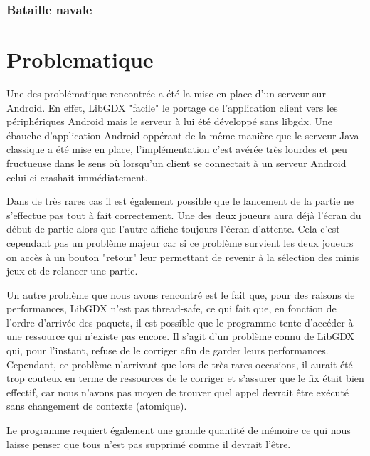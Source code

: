 \documentclass{report}
\begin{document}
\subsection{Bataille navale}





\chapter{Problematique}
Une des problématique rencontrée a été la mise en place d'un serveur sur Android. En effet, LibGDX "facile" le portage de l'application client vers les
périphériques Android mais le serveur à lui été développé sans libgdx. Une ébauche d'application Android oppérant de la même manière que le serveur Java classique a
été mise en place, l'implémentation c'est avérée très lourdes et peu fructueuse dans le sens où lorsqu'un client se connectait à un serveur Android celui-ci crashait
immédiatement.

Dans de très rares cas il est également possible que le lancement de la partie ne s'effectue pas tout à fait correctement. Une des deux joueurs aura déjà l'écran du début de partie alors
que l'autre affiche toujours l'écran d'attente. Cela c'est cependant pas un problème majeur car si ce problème survient les deux joueurs on accès à un bouton "retour" leur
permettant de revenir à la sélection des minis jeux et de relancer une partie.

Un autre problème que nous avons rencontré est le fait que, pour des raisons de performances, LibGDX n'est pas thread-safe, ce qui fait que, en fonction de l'ordre d'arrivée des paquets, il est possible que le programme tente d'accéder à une ressource qui n'existe pas encore. Il s'agit d'un problème connu de LibGDX qui, pour l'instant, refuse de le corriger afin de garder leurs performances. Cependant, ce problème n'arrivant que lors de très rares occasions, il aurait été trop couteux en terme de ressources de le corriger et s'assurer que le fix était bien effectif, car nous n'avons pas moyen de trouver quel appel devrait être exécuté sans changement de contexte (atomique).

Le programme requiert également une grande quantité de mémoire ce qui nous laisse penser que tous n'est pas supprimé comme il devrait l'être.
\end{document}
